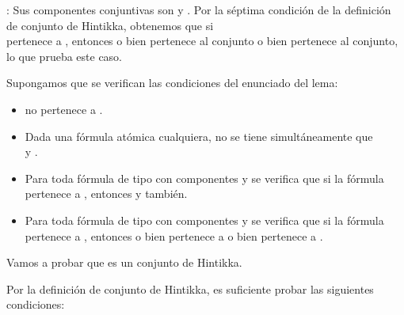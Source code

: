\begin{isabellebody}
\begin{isamarkuptext}
\begin{demostracion}
  : Sus componentes conjuntivas son  y . 
    Por la séptima condición de la definición de conjunto de Hintikka, obtenemos 
    que si\\  pertenece a , entonces o bien  pertenece al conjunto
    o bien  pertenece al conjunto, lo que prueba este caso.

\textbf{}

  Supongamos que se verifican las condiciones del enunciado del lema:

  \begin{itemize}
    \item \isa{{\isasymbottom}} no pertenece a .
    \item Dada  una fórmula atómica cualquiera, no se tiene 
    simultáneamente que\\  y .
    \item Para toda fórmula de tipo \isa{{\isasymalpha}} con componentes  y  se verifica 
    que si la fórmula pertenece a , entonces  y  también.
    \item Para toda fórmula de tipo \isa{{\isasymbeta}} con componentes  y  se verifica 
    que si la fórmula pertenece a , entonces o bien  pertenece
    a  o bien  pertenece a .
  \end{itemize}  

  Vamos a probar que  es un conjunto de Hintikka.

  Por la definición de conjunto de Hintikka, es suficiente probar las siguientes
  condiciones:


\end{demostracion}
\end{isamarkuptext}
\end{isabellebody}
